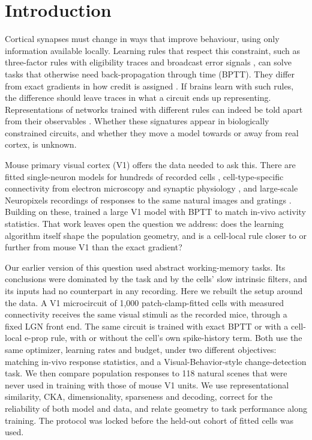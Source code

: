 \section{Introduction}

Cortical synapses must change in ways that improve behaviour, using only information available
locally. Learning rules that respect this constraint, such as three-factor rules with eligibility
traces and broadcast error signals \citep{gerstner2018,murray2019rflo,bellec2020eprop}, can solve
tasks that otherwise need back-propagation through time (BPTT). They differ from exact gradients in
how credit is assigned \citep{lillicrap2020,richards2019}. If brains learn with such rules, the
difference should leave traces in what a circuit ends up representing. Representations of
networks trained with different rules can indeed be told apart from their observables
\citep{nayebi2020}. Whether these signatures appear in biologically constrained circuits, and
whether they move a model towards or away from real cortex, is unknown.

Mouse primary visual cortex (V1) offers the data needed to ask this. There are fitted
single-neuron models for hundreds of recorded cells \citep{yeung2025gfr}, cell-type-specific
connectivity from electron microscopy and synaptic physiology \citep{campagnola2022}, and
large-scale Neuropixels recordings of responses to the same natural images and gratings
\citep{siegle2021,devries2020}. Building on these, \citet{ito2026} trained a large V1 model with BPTT
to match in-vivo activity statistics. That work leaves open the question we address: does the
learning algorithm itself shape the population geometry, and is a cell-local rule closer to or
further from mouse V1 than the exact gradient?

Our earlier version of this question used abstract working-memory tasks. Its conclusions were
dominated by the task and by the cells' slow intrinsic filters, and its inputs had no counterpart
in any recording. Here we rebuilt the setup around the data. A V1 microcircuit of 1,000
patch-clamp-fitted cells with measured connectivity receives the same visual stimuli as the
recorded mice, through a fixed LGN front end. The same circuit is trained with exact BPTT or with a
cell-local e-prop rule, with or without the cell's own spike-history term. Both use the same
optimizer, learning rates and budget, under two different objectives: matching in-vivo response
statistics, and a Visual-Behavior-style change-detection task. We then compare population
responses to 118 natural scenes that were never used in training with those of mouse V1 units. We
use representational similarity, CKA, dimensionality, sparseness and decoding, correct for the
reliability of both model and data, and relate geometry to task performance along training. The
protocol was locked before the held-out cohort of fitted cells was used.

